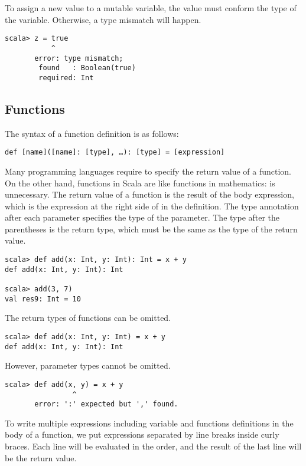To assign a new value to a mutable variable, the value must conform the
type of the variable. Otherwise, a type mismatch will happen.

\begin{verbatim}
scala> z = true
           ^
       error: type mismatch;
        found   : Boolean(true)
        required: Int
\end{verbatim}

\subsection{Functions}

The syntax of a function definition is as follows:

\begin{verbatim}
def [name]([name]: [type], …): [type] = [expression]
\end{verbatim}

Many programming languages require  to specify the return value of a function.
On the other hand, functions in Scala are like functions in mathematics:  is unnecessary.
The return value of a function is the result of the body expression, which is the expression
at the right side of \code{=} in the definition. The type annotation after each parameter specifies
the type of the parameter. The type after the parentheses is the return type, which must be the
same as the type of the return value.

\begin{verbatim}
scala> def add(x: Int, y: Int): Int = x + y
def add(x: Int, y: Int): Int

scala> add(3, 7)
val res9: Int = 10
\end{verbatim}

The return types of functions can be omitted.

\begin{verbatim}
scala> def add(x: Int, y: Int) = x + y
def add(x: Int, y: Int): Int
\end{verbatim}

However, parameter types cannot be omitted.

\begin{verbatim}
scala> def add(x, y) = x + y
                ^
       error: ':' expected but ',' found.
\end{verbatim}

To write multiple expressions including variable and functions definitions
in the body of a function, we put expressions separated by line breaks
inside curly braces.
Each line will be evaluated in the order, and the result of the last line will
be the return value.

